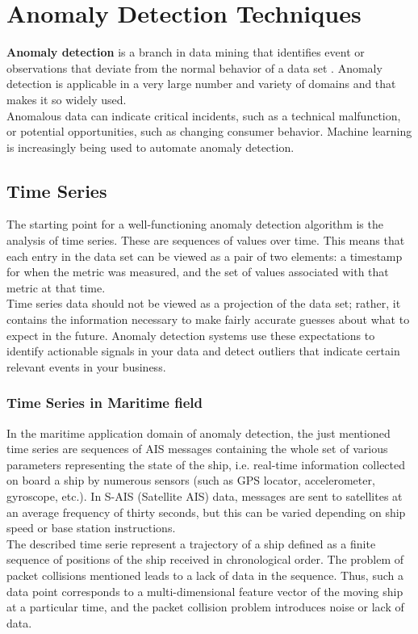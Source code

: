     
    
\newpage  

\section{Anomaly Detection Techniques}

    \textbf{Anomaly detection} is a branch in data mining that identifies event or observations that deviate from the normal behavior of a data set \cite{anomaly_detection}. Anomaly detection is applicable in a very large number and variety of domains and that makes it so widely used.
    \\
    Anomalous data can indicate critical incidents, such as a technical malfunction, or potential opportunities, such as changing consumer behavior. Machine learning is increasingly being used to automate anomaly detection.
    
    \subsection{Time Series}
    The starting point for a well-functioning anomaly detection algorithm is the analysis of time series. These are sequences of values over time. This means that each entry in the data set can be viewed as a pair of two elements: a timestamp for when the metric was measured, and the set of values associated with that metric at that time. 
    \\ 
    Time series data should not be viewed as a projection of the data set; rather, it contains the information necessary to make fairly accurate guesses about what to expect in the future. Anomaly detection systems use these expectations to identify actionable signals in your data and detect outliers that indicate certain relevant events in your business.
    
    \subsubsection{Time Series in Maritime field}
    In the maritime application domain of anomaly detection, the just mentioned time series are sequences of AIS messages containing the whole set of various parameters representing the state of the ship, i.e. real-time information collected on board a ship by numerous sensors (such as GPS locator, accelerometer, gyroscope, etc.). 
    In S-AIS (Satellite AIS) data, messages are sent to satellites at an average frequency of thirty seconds, but this can be varied depending on ship speed or base station instructions. 
    \\
    The described time serie represent a trajectory of a ship defined as a finite sequence of positions of the ship received in chronological order. The problem of packet collisions mentioned leads to a lack of data in the sequence. Thus, such a data point corresponds to a multi-dimensional feature vector of the moving ship at a particular time, and the packet collision problem introduces noise or lack of data.

